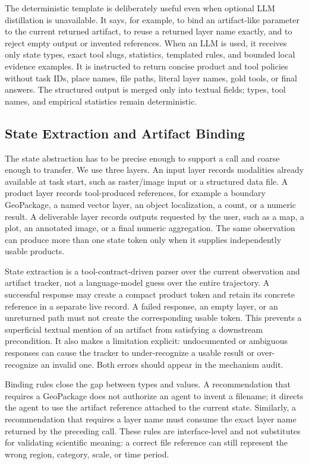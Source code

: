 \documentclass[10pt]{article}
\begin{document}
The deterministic template is deliberately useful even when optional LLM distillation is unavailable. It says, for example, to bind an artifact-like parameter to the current returned artifact, to reuse a returned layer name exactly, and to reject empty output or invented references. When an LLM is used, it receives only state types, exact tool slugs, statistics, templated rules, and bounded local evidence examples. It is instructed to return concise product and tool policies without task IDs, place names, file paths, literal layer names, gold tools, or final answers. The structured output is merged only into textual fields; types, tool names, and empirical statistics remain deterministic.

\subsection{State Extraction and Artifact Binding}
The state abstraction has to be precise enough to support a call and coarse enough to transfer. We use three layers. An input layer records modalities already available at task start, such as raster/image input or a structured data file. A product layer records tool-produced references, for example a boundary GeoPackage, a named vector layer, an object localization, a count, or a numeric result. A deliverable layer records outputs requested by the user, such as a map, a plot, an annotated image, or a final numeric aggregation. The same observation can produce more than one state token only when it supplies independently usable products.

State extraction is a tool-contract-driven parser over the current observation and artifact tracker, not a language-model guess over the entire trajectory. A successful response may create a compact product token and retain its concrete reference in a separate live record. A failed response, an empty layer, or an unreturned path must not create the corresponding usable token. This prevents a superficial textual mention of an artifact from satisfying a downstream precondition. It also makes a limitation explicit: undocumented or ambiguous responses can cause the tracker to under-recognize a usable result or over-recognize an invalid one. Both errors should appear in the mechanism audit.

Binding rules close the gap between types and values. A recommendation that requires a GeoPackage does not authorize an agent to invent a filename; it directs the agent to use the artifact reference attached to the current state. Similarly, a recommendation that requires a layer name must consume the exact layer name returned by the preceding call. These rules are interface-level and not substitutes for validating scientific meaning: a correct file reference can still represent the wrong region, category, scale, or time period.
\end{document}
